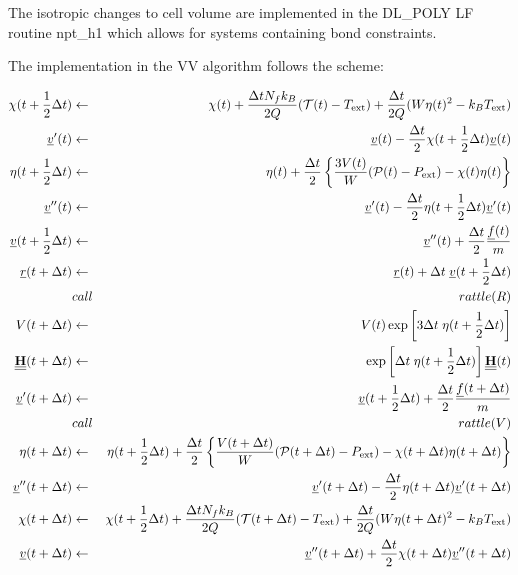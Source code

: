 The isotropic changes to cell volume are implemented in the DL\_POLY
LF routine {\sc npt\_h1} which allows for systems containing bond
constraints.

The implementation in the VV algorithm follows the scheme:

\begin{eqnarray}
\chi(t+{1\over 2}\Delta t) &\leftarrow& \chi(t) + {\Delta t N_fk_B  \over
2 Q} ( {\cal T}(t) - T_{\rm ext}) + {\Delta t\over 2Q}(W\eta(t)^2-k_B
T_{\rm ext}) \nonumber\\
\mbox{$\underline{v}$}'(t)&\leftarrow& \mbox{$\underline{v}$}(t) -
 {\Delta t \over 2}\chi(t+{1\over 2}\Delta t)\mbox{$\underline{v}$}(t)\nonumber\\
\eta(t+{1\over 2}\Delta t) &\leftarrow& \eta(t) + {\Delta t \over 2}\left\{ {3V(t) \over W} 
( {\cal P}(t) - P_{\rm ext}) -\chi(t)\eta(t) \right\}\nonumber\\
\mbox{$\underline{v}$}''(t)&\leftarrow& \mbox{$\underline{v}$}'(t) - {\Delta t \over
2}\eta(t+{1\over 2}\Delta t)\mbox{$\underline{v}$}'(t)\nonumber\\
\mbox{$\underline{v}$}(t + {1\over 2} \Delta t)&\leftarrow& \mbox{$\underline{v}$}''(t)
+ {\Delta t \over 2} {\mbox{$\underline{f}$}(t)\over m} \nonumber \\
\mbox{$\underline{r}$}(t+\Delta t) &\leftarrow& \mbox{$\underline{r}$}(t) + \Delta t \;
\mbox{$\underline{v}$}(t+{1\over 2}\Delta t)\nonumber \\
&call&rattle(R) \nonumber \\
V(t+\Delta t)& \leftarrow& V(t) \exp\left[3\Delta t\; \eta(t+{1\over 2}\Delta t)\right]\nonumber\\
\mbox{$\underline{\underline{\bf H}}$}(t+\Delta t) &\leftarrow& \exp\left[\Delta t
\;\eta(t+{1\over 2}\Delta t)\right]\mbox{$\underline{\underline{\bf H}}$}(t)\nonumber \\
\mbox{$\underline{v}$}'(t + \Delta t)&\leftarrow& \mbox{$\underline{v}$}(t + {1 \over 2}\Delta t) +
 {\Delta t \over 2} {\mbox{$\underline{f}$}(t + \Delta t)\over m} \nonumber \\
&call&rattle(V) \nonumber \\
\eta(t+\Delta t) &\leftarrow& \eta(t+{1\over 2}\Delta t) + 
{\Delta t \over 2} \left\{{V(t+\Delta t) \over W} 
( {\cal P}(t+\Delta t) - P_{\rm ext})-\chi(t+\Delta t)\eta(t+\Delta t)\right\} \nonumber\\
\mbox{$\underline{v}$}''(t+\Delta t)&\leftarrow& \mbox{$\underline{v}$}'(t+\Delta t) -
 {\Delta t \over 2}\eta(t+\Delta t)\mbox{$\underline{v}$}'(t+\Delta t)\nonumber\\
\chi(t+\Delta t) &\leftarrow& \chi(t+{1\over 2}\Delta t) + {\Delta t
N_f k_B \over 2Q }( {{\cal T}(t+\Delta t) - T_{\rm ext}} ) 
+ {\Delta t\over 2Q}(W\eta(t+\Delta t)^2-k_B T_{\rm ext})\nonumber \\
\mbox{$\underline{v}$}(t + \Delta t)&\leftarrow& \mbox{$\underline{v}$}''(t + \Delta t) +
 {\Delta t \over 2}\chi(t+\Delta t)\mbox{$\underline{v}$}''(t+\Delta t)
\end{eqnarray}

